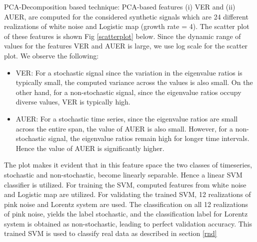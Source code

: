 \documentclass[journal]{IEEEtran}
\begin{document}
	
		PCA-Decomposition based technique: PCA-based features (i) VER and (ii) AUER,  are computed for the considered synthetic signals which are 24 different realizations of white noise and Logistic map (growth rate = 4). The scatter plot of these features is shown Fig \ref{scatterplot} below. Since the dynamic range of values for the features VER and AUER is large, we use log scale for the scatter plot. We observe the following:
	\begin{itemize}
		\item VER: For a stochastic signal since the variation in the eigenvalue ratios is typically small, the computed variance across the values is also small. On the other hand, for a non-stochastic signal, since the eigenvalue ratios occupy diverse values, VER is typically high.
		\item AUER: For a stochastic time series, since the eigenvalue ratios  are small across the entire span, the value of AUER is also small. However, for a non-stochastic signal, the eigenvalue ratios remain high for longer time intervals. Hence the value of AUER is significantly higher.
	\end{itemize}


	The plot makes it evident that in this feature space the two classes of timeseries, stochastic and non-stochastic, become linearly separable. Hence a linear SVM classifier is utilized. For training the SVM, computed features from white noise and Logistic map are utilized. For validating the trained SVM, 12 realizations of pink noise and Lorentz system are used. The classification on all 12 realizations of pink noise, yields the label stochastic, and the classification label for Lorentz system is obtained as non-stochastic, leading to perfect validation accuracy. This trained SVM is used to classify real data as described in section \ref{rnd}
	
\end{document}

